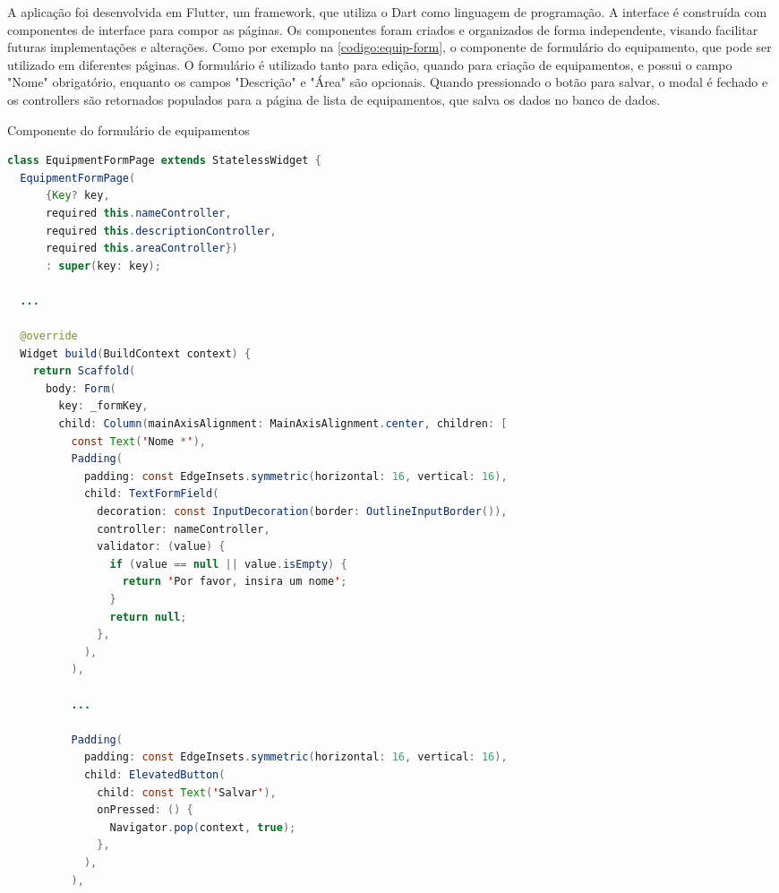 A aplicação foi desenvolvida em Flutter, um framework, que utiliza o Dart como linguagem de programação. A interface é construída com componentes de interface para compor as páginas. Os componentes foram criados e organizados de forma independente, visando facilitar futuras implementações e alterações. Como por exemplo na \autoref{codigo:equip-form}, o componente de formulário do equipamento, que pode ser utilizado em diferentes páginas. O formulário é utilizado tanto para edição, quando para criação de equipamentos, e possui o campo "Nome" obrigatório, enquanto os campos "Descrição" e "Área" são opcionais. Quando pressionado o botão para salvar, o modal é fechado e os controllers são retornados populados para a página de lista de equipamentos, que salva os dados no banco de dados.

\begin{sourcecode}[htb]
  \caption{\label{codigo:equip-form}Componente do formulário de equipamentos}
  \begin{lstlisting}[frame=single, language=Java]
class EquipmentFormPage extends StatelessWidget {
  EquipmentFormPage(
      {Key? key,
      required this.nameController,
      required this.descriptionController,
      required this.areaController})
      : super(key: key);

  ...

  @override
  Widget build(BuildContext context) {
    return Scaffold(
      body: Form(
        key: _formKey,
        child: Column(mainAxisAlignment: MainAxisAlignment.center, children: [
          const Text('Nome *'),
          Padding(
            padding: const EdgeInsets.symmetric(horizontal: 16, vertical: 16),
            child: TextFormField(
              decoration: const InputDecoration(border: OutlineInputBorder()),
              controller: nameController,
              validator: (value) {
                if (value == null || value.isEmpty) {
                  return 'Por favor, insira um nome';
                }
                return null;
              },
            ),
          ),
		  
          ...
		  
          Padding(
            padding: const EdgeInsets.symmetric(horizontal: 16, vertical: 16),
            child: ElevatedButton(
              child: const Text('Salvar'),
              onPressed: () {
                Navigator.pop(context, true);
              },
            ),
          ),
\end{lstlisting}
  \fonte{}
\end{sourcecode}


